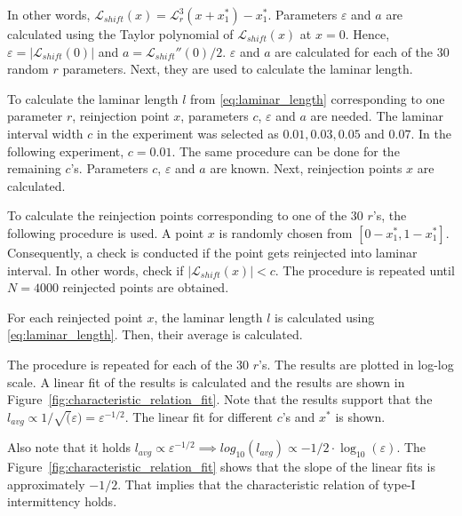 In other words, $\mathcal{L}_{shift}(x) = \mathcal{L}_{r}^{3}(x + x^{*}_{1}) - x^{*}_{1}$.
Parameters $\varepsilon$ and $a$ are calculated using the Taylor polynomial of $\mathcal{L}_{shift}(x)$ at $x = 0$.
Hence, $\varepsilon = | \mathcal{L}_{shift}(0) |$ and $a = \mathcal{L}_{shift}''(0) / 2$.
$\varepsilon$ and $a$ are calculated for each of the $30$ random $r$ parameters.
Next, they are used to calculate the laminar length.
\par
To calculate the laminar length $l$ from \eqref{eq:laminar_length} corresponding to one parameter $r$, reinjection point $x$, parameters $c$, $\varepsilon$ and $a$ are needed.
The laminar interval width $c$ in the experiment was selected as $0.01, 0.03, 0.05$ and $0.07$.
In the following experiment, $c = 0.01$.
The same procedure can be done for the remaining $c$'s.
Parameters $c$, $\varepsilon$ and $a$ are known.
Next, reinjection points $x$ are calculated.
\par
To calculate the reinjection points corresponding to one of the $30$ $r$'s, the following procedure is used.
A point $x$ is randomly chosen from $[ 0-x^{*}_{1}, 1-x^{*}_{1} ]$.
Consequently, a check is conducted if the point gets reinjected into laminar interval.
In other words, check if $| \mathcal{L}_{shift}(x) | < c$.
The procedure is repeated until $N = 4000$ reinjected points are obtained.
\par
For each reinjected point $x$, the laminar length $l$ is calculated using \eqref{eq:laminar_length}.
Then, their average is calculated.
\par
The procedure is repeated for each of the $30$ $r$'s.
The results are plotted in log-log scale.
A linear fit of the results is calculated and the results are shown in Figure~\ref{fig:characteristic_relation_fit}.
Note that the results support that the $l_{avg} \propto 1/\sqrt(\varepsilon) = \varepsilon ^ {-1/2}$.
The linear fit for different $c$'s and $x^{*}$ is shown.
\par
Also note that it holds $l_{avg} \propto \varepsilon ^ {-1/2} \implies log_{10}(l_{avg}) \propto -1/2 \cdot \log_{10}(\varepsilon)$.
The Figure~\ref{fig:characteristic_relation_fit} shows that the slope of the linear fits is approximately $-1/2$.
That implies that the characteristic relation of type-I intermittency holds. 

